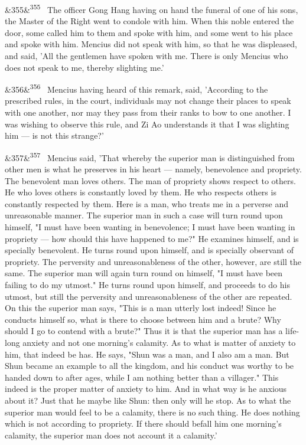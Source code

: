 \documentclass[12pt]{article}
\newcommand{\para}[1][]{\par\noindent\ifx&#1&\else\textsuperscript{\footnotesize #1}~\fi}
\begin{document}
\para[355] The officer Gong Hang having on hand the funeral of one of his sons, the Master of the Right went to condole with him. When this noble entered the door, some called him to them and spoke with him, and some went to his place and spoke with him. Mencius did not speak with him, so that he was displeased, and said, 'All the gentlemen have spoken with me. There is only Mencius who does not speak to me, thereby slighting me.'

\para[356] Mencius having heard of this remark, said, 'According to the prescribed rules, in the court, individuals may not change their places to speak with one another, nor may they pass from their ranks to bow to one another. I was wishing to observe this rule, and Zi Ao understands it that I was slighting him --- is not this strange?'

\para[357] Mencius said, 'That whereby the superior man is distinguished from other men is what he preserves in his heart --- namely, benevolence and propriety. The benevolent man loves others. The man of propriety shows respect to others. He who loves others is constantly loved by them. He who respects others is constantly respected by them. Here is a man, who treats me in a perverse and unreasonable manner. The superior man in such a case will turn round upon himself, "I must have been wanting in benevolence; I must have been wanting in propriety --- how should this have happened to me?" He examines himself, and is specially benevolent. He turns round upon himself, and is specially observant of propriety. The perversity and unreasonableness of the other, however, are still the same. The superior man will again turn round on himself, "I must have been failing to do my utmost." He turns round upon himself, and proceeds to do his utmost, but still the perversity and unreasonableness of the other are repeated. On this the superior man says, "This is a man utterly lost indeed! Since he conducts himself so, what is there to choose between him and a brute? Why should I go to contend with a brute?" Thus it is that the superior man has a life-long anxiety and not one morning's calamity. As to what is matter of anxiety to him, that indeed be has. He says, "Shun was a man, and I also am a man. But Shun became an example to all the kingdom, and his conduct was worthy to be handed down to after ages, while I am nothing better than a villager." This indeed is the proper matter of anxiety to him. And in what way is he anxious about it? Just that he maybe like Shun: then only will he stop. As to what the superior man would feel to be a calamity, there is no such thing. He does nothing which is not according to propriety. If there should befall him one morning's calamity, the superior man does not account it a calamity.'
\end{document}
